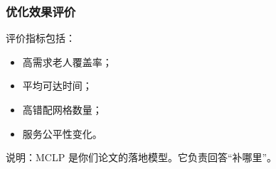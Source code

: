 \subsubsection{优化效果评价}

评价指标包括：

\begin{itemize}
\item 高需求老人覆盖率；
\item 平均可达时间；
\item 高错配网格数量；
\item 服务公平性变化。
\end{itemize}

说明：MCLP 是你们论文的落地模型。它负责回答“补哪里”。
